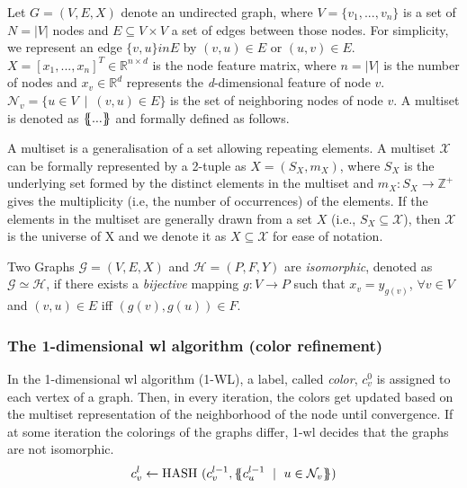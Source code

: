Let $G = (V,E, X)$ denote an undirected graph, where $V =\{v_{1},...,v_{n}\}$ is a set of $ N = |V|$ nodes and $E \subseteq V\times V $ a set of edges between those nodes. For simplicity, we represent an edge $\{v,u\} in E$ by $(v,u) \in E$ or $(u,v)\in E$. $X= [x_{1},...,x_{n}]^{T} \in \mathbb{R}^{n \times d}$ is the node feature matrix, where $n = |V|$ is the number of nodes and $x_{v} \in \mathbb{R}^{d}$ represents the \textit{d}-dimensional feature of node $v$. $\mathcal{N}_{v}= \{u \in V\ \mid \ (v,u) \in E\}$ is the set of neighboring nodes of node $v$. A multiset is denoted
as $\ldblbrace...\rdblbrace$ and formally defined as follows.
\begin{defn}[Multiset]
    A multiset is a generalisation of a set allowing repeating elements. A multiset $\mathcal{X}$ can be formally represented by a 2-tuple as $X = (S_{X}, m_{X})$, where $S_{X}$ is the
    underlying set formed by the distinct elements in the multiset and $m_{X}:S_{X} \rightarrow
        \mathbb{Z}^{+}$ gives the multiplicity (i.e, the number of occurrences) of the elements.
    If the elements in the multiset are generally drawn from a set $X$ (i.e., $S_{X} \subseteq \mathcal{X}$), then $\mathcal{X}$ is the universe of X and we denote it as $X \subseteq \mathcal{X}$ for ease of notation.
\end{defn}
\begin{defn}[Isomorphism]
    Two Graphs $\mathcal{G}= (V,E,X)$ and $\mathcal{H}= (P,F,Y)$ are \textit{isomorphic}, denoted as $\mathcal{G} \simeq \mathcal{H}$, if there exists a \textit{bijective} mapping $g: V \rightarrow P$ such that $x_{v}= y_{g(v)}$, $\forall v \in V$ and $(v,u) \in E$ iff $(g(v),g(u)) \in F$.
\end{defn}
\subsubsection{The 1-dimensional \acs{wl} algorithm (color refinement)}
In the 1-dimensional \ac{wl} algorithm (1-WL), a label, called \emph{color}, $c_{v}^{0}$ is assigned to each vertex of a graph. Then, in every iteration, the colors get updated based on the multiset representation of the neighborhood of the node until convergence. If at some iteration the colorings of the graphs differ, 1-\ac{wl} decides that the graphs are not isomorphic.
\begin{align*}
    c_{v}^{l} \leftarrow \mathrm{HASH}\ (c_{v}^{l-1}, \ldblbrace c_{u}^{l-1}\ \mid \ u \in \mathcal{N}_{v} \rdblbrace)
\end{align*}
\\


